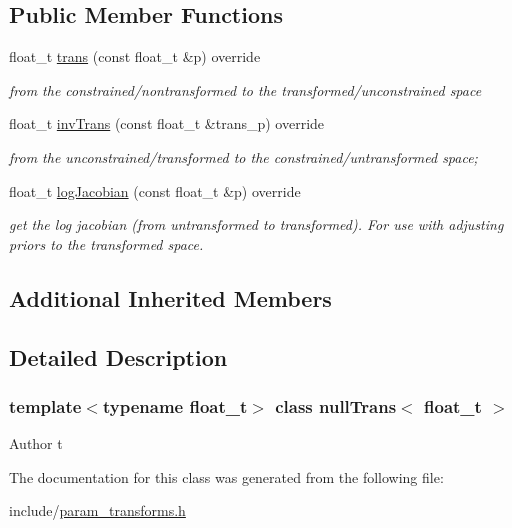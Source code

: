 \subsection*{Public Member Functions}
\begin{DoxyCompactItemize}
\item 
\mbox{\label{classnullTrans_a908d4173fc1a56498fef91bd212b5b1f}} 
float\+\_\+t \hyperlink{classnullTrans_a908d4173fc1a56498fef91bd212b5b1f}{trans} (const float\+\_\+t \&p) override
\begin{DoxyCompactList}\small\item\em from the constrained/nontransformed to the transformed/unconstrained space \end{DoxyCompactList}\item 
\mbox{\label{classnullTrans_ac603661febf8ff99ccd79c682e050b1e}} 
float\+\_\+t \hyperlink{classnullTrans_ac603661febf8ff99ccd79c682e050b1e}{inv\+Trans} (const float\+\_\+t \&trans\+\_\+p) override
\begin{DoxyCompactList}\small\item\em from the unconstrained/transformed to the constrained/untransformed space; \end{DoxyCompactList}\item 
\mbox{\label{classnullTrans_a12221c70fb73243de9133484b62406e8}} 
float\+\_\+t \hyperlink{classnullTrans_a12221c70fb73243de9133484b62406e8}{log\+Jacobian} (const float\+\_\+t \&p) override
\begin{DoxyCompactList}\small\item\em get the log jacobian (from untransformed to transformed). For use with adjusting priors to the transformed space. \end{DoxyCompactList}\end{DoxyCompactItemize}
\subsection*{Additional Inherited Members}


\subsection{Detailed Description}
\subsubsection*{template$<$typename float\+\_\+t$>$\newline
class null\+Trans$<$ float\+\_\+t $>$}

\begin{DoxyAuthor}{Author}
t 
\end{DoxyAuthor}


The documentation for this class was generated from the following file\+:\begin{DoxyCompactItemize}
\item 
include/\hyperlink{param__transforms_8h}{param\+\_\+transforms.\+h}\end{DoxyCompactItemize}
